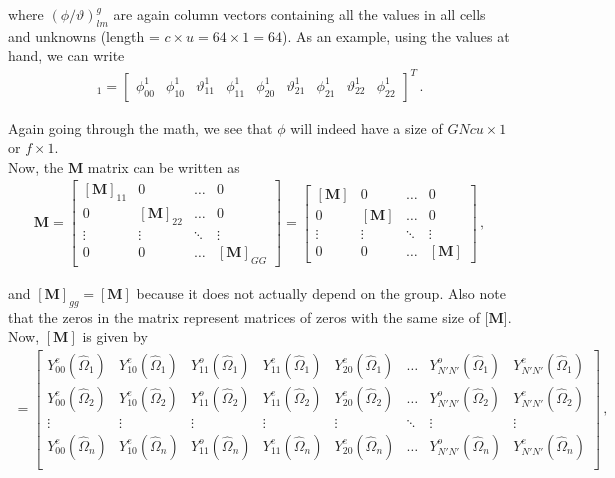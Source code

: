 \documentclass[10pt]{article}
\begin{document}
where $(\phi/\vartheta)_{lm}^g$ are again column vectors containing all the values in all cells and unknowns (length = $c \times u = 64 \times 1 = 64$). As an example, using the values at hand, we can write
%
\begin{align*}
[\phi]_1 =
\begin{bmatrix}
    \phi_{00}^1 & \phi_{10}^1 & \vartheta_{11}^1 & \phi_{11}^1 & \phi_{20}^1 & \vartheta_{21}^1 & \phi_{21}^1 & \vartheta_{22}^1 & \phi_{22}^1
\end{bmatrix} ^ T\,.
\end{align*}

Again going through the math, we see that $\phi$ will indeed have a size of $GNcu \times 1$ or $f \times 1$.\\

Now, the $\textbf{M}$ matrix can be written as
%
\begin{align*}
\textbf{M} = 
\begin{bmatrix}
    [\textbf{M}]_{11} & 0 & \dots & 0  \\
    0 & [\textbf{M}]_{22} & \dots & 0  \\
    \vdots & \vdots & \ddots & \vdots \\
    0 & 0 & \dots & [\textbf{M}]_{GG}
\end{bmatrix}
=
\begin{bmatrix}
    [\textbf{M}] & 0 & \dots & 0  \\
    0 & [\textbf{M}] & \dots & 0  \\
    \vdots & \vdots & \ddots & \vdots \\
    0 & 0 & \dots & [\textbf{M}]
\end{bmatrix}\,,
\end{align*}

and $[\textbf{M}]_{gg} = [\textbf{M}]$ because it does not actually depend on the group. Also note that the zeros in the matrix represent matrices of zeros with the same size of [$\textbf{M}$]. Now, $[\textbf{M}]$ is given by
%
\begin{align*}
[\textbf{M}] = 
\begin{bmatrix}
   Y_{00}^e(\hat{\Omega}_1) & Y_{10}^e(\hat{\Omega}_1) & Y_{11}^o(\hat{\Omega}_1) & Y_{11}^e(\hat{\Omega}_1) & Y_{20}^e(\hat{\Omega}_1) & \dots & Y_{N'N'}^o(\hat{\Omega}_1) & Y_{N'N'}^e(\hat{\Omega}_1)  \\
      Y_{00}^e(\hat{\Omega}_2) & Y_{10}^e(\hat{\Omega}_2) & Y_{11}^o(\hat{\Omega}_2) & Y_{11}^e(\hat{\Omega}_2) & Y_{20}^e(\hat{\Omega}_2) & \dots & Y_{N'N'}^o(\hat{\Omega}_2) & Y_{N'N'}^e(\hat{\Omega}_2)  \\
      \vdots & \vdots & \vdots & \vdots & \vdots & \ddots &  \vdots & \vdots \\
         Y_{00}^e(\hat{\Omega}_n) & Y_{10}^e(\hat{\Omega}_n) & Y_{11}^o(\hat{\Omega}_n) & Y_{11}^e(\hat{\Omega}_n) & Y_{20}^e(\hat{\Omega}_n) & \dots & Y_{N'N'}^o(\hat{\Omega}_n) & Y_{N'N'}^e(\hat{\Omega}_n)  \\
\end{bmatrix}\,,
\end{align*}
\end{document}
